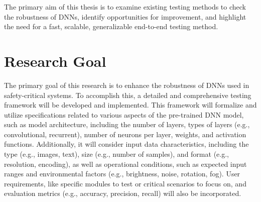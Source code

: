\begin{tcolorbox}[colback=purple!2!white, colframe=purple,title= Thesis Goal]

    The primary aim of this thesis is to examine existing testing methods to check the robustness of DNNs, identify opportunities for improvement, and highlight the need for a fast, scalable, generalizable end-to-end testing method.
    \end{tcolorbox}
    






\section{Research Goal}

 The primary goal of this research is to enhance the robustness of DNNs used in safety-critical systems. To accomplish this, a detailed and comprehensive testing framework will be developed and implemented. This framework will formalize and utilize specifications related to various aspects of the pre-trained DNN model, such as model architecture, including the number of layers, types of layers (e.g., convolutional, recurrent), number of neurons per layer, weights, and activation functions. Additionally, it will consider input data characteristics, including the type (e.g., images, text), size (e.g., number of samples), and format (e.g., resolution, encoding), as well as operational conditions, such as expected input ranges and environmental factors (e.g., brightness, noise, rotation, fog). User requirements, like specific modules to test or critical scenarios to focus on, and evaluation metrics (e.g., accuracy, precision, recall) will also be incorporated.

